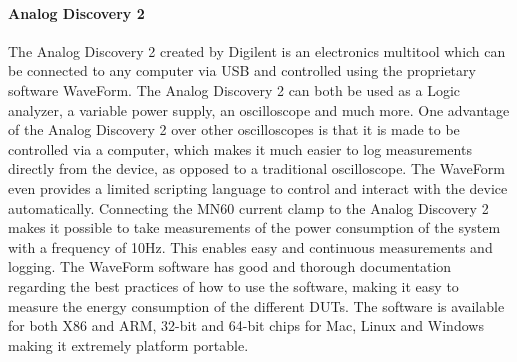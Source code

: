 \paragraph*{Analog Discovery 2}
The Analog Discovery 2 created by Digilent\cite{AnalogDiscovery2} is an electronics multitool which can be connected to any computer via USB and controlled using the proprietary software WaveForm. The Analog Discovery 2 can both be used as a Logic analyzer, a variable power supply, an oscilloscope and much more\cite{AnalogDoc}. One advantage of the Analog Discovery 2 over other oscilloscopes is that it is made to be controlled via a computer, which makes it much easier to log measurements directly from the device, as opposed to a traditional oscilloscope. The WaveForm even provides a limited scripting language to control and interact with the device automatically. Connecting the MN60 current clamp to the Analog Discovery 2 makes it possible to take measurements of the power consumption of the system with a frequency of 10Hz. This enables easy and continuous measurements and logging. The WaveForm software has good and thorough documentation regarding the best practices of how to use the software, making it easy to measure the energy consumption of the different DUTs. The software is available for both X86 and ARM, 32-bit and 64-bit chips for Mac, Linux and Windows making it extremely platform portable.\cite{AnalogDoc}